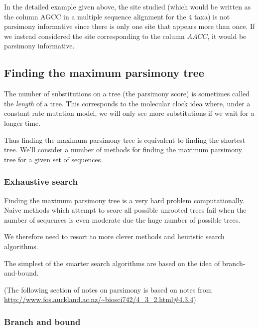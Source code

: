 \documentclass[11pt]{article}
\begin{document}
In the detailed example given above, the site studied (which would be written as the column AGCC in a multiple sequence alignment for the 4 taxa) is not parsimony informative since there is only one site that appears more than once.    If we instead considered the site corresponding to the column $AACC$, it would be parsimony informative.
 


\subsection{Finding the maximum parsimony  tree}

The number of substitutions on a tree (the parsimony score) is sometimes called the {\em length}  of a tree.  This corresponds to the molecular clock idea where, under a constant rate mutation model, we will only see more substitutions if we wait for a longer time.  

Thus finding the maximum parsimony tree is equivalent to finding the shortest tree.  We'll consider a number of methods for finding the maximum parsimony tree for a given set of sequences.


\subsubsection{Exhaustive search}

Finding the maximum parsimony tree is a very hard problem computationally.  Naive methods which attempt to score all possible unrooted trees fail when the number of sequences is even moderate due the huge number of possible trees. 



We therefore need to resort to more clever methods and heuristic  search algorithms.  

 The simplest of the smarter search algorithms are based on the idea of branch-and-bound. %





(The following section of notes on parsimony is based on notes from \url{http://www.fos.auckland.ac.nz/~biosci742/4_3_2.html#4.3.4})

\subsubsection{Branch and bound}
\end{document}
